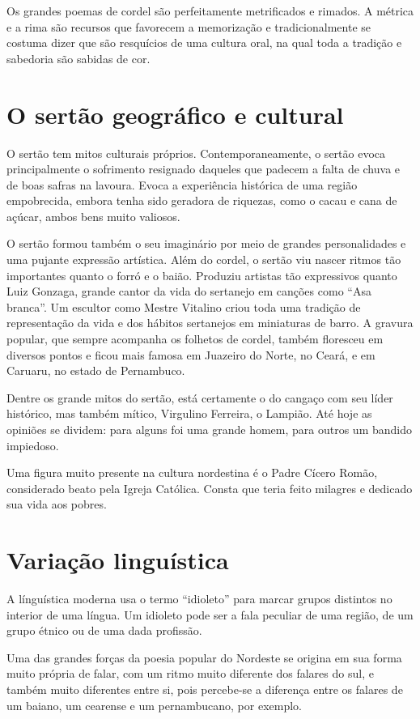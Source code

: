 Os grandes poemas de cordel são perfeitamente metrificados e rimados. A métrica
e a rima são recursos que favorecem a memorização e tradicionalmente se costuma
dizer que são resquícios de uma cultura oral, na qual toda a tradição e
sabedoria são sabidas de cor.  


\section{O sertão geográfico e cultural}

O sertão tem mitos culturais próprios. Contemporaneamente, o sertão evoca
principalmente o sofrimento resignado daqueles que padecem a falta de chuva e
de boas safras na lavoura. Evoca a experiência histórica de uma região
empobrecida, embora tenha sido geradora de riquezas, como o cacau e cana de
açúcar, ambos bens muito valiosos. 

O sertão formou também o seu imaginário por meio de grandes personalidades e
uma pujante expressão artística. Além do cordel, o sertão viu nascer ritmos tão
importantes quanto o forró e o baião. Produziu artistas tão expressivos quanto
Luiz Gonzaga, grande cantor da vida do sertanejo em canções como “Asa branca”.
Um escultor como Mestre Vitalino criou toda uma tradição de representação da
vida e dos hábitos sertanejos em miniaturas de barro. A gravura popular, que
sempre acompanha os folhetos de cordel, também floresceu em diversos pontos e
ficou mais famosa em Juazeiro do Norte, no Ceará, e em Caruaru, no estado de
Pernambuco. 

Dentre os grande mitos do sertão, está certamente o do cangaço com seu líder
histórico, mas também mítico, Virgulino Ferreira, o Lampião. Até hoje as
opiniões se dividem: para alguns foi uma grande homem, para outros um bandido
impiedoso. 

Uma figura muito presente na cultura nordestina é o Padre Cícero Romão,
considerado beato pela Igreja Católica. Consta que teria feito milagres e
dedicado sua vida aos pobres. 

\section{Variação linguística}

A línguística moderna usa o termo “idioleto” para marcar grupos distintos no
interior de uma língua. Um idioleto pode ser a fala peculiar de uma região, de
um grupo étnico ou de uma dada profissão. 

Uma das grandes forças da poesia popular do Nordeste se origina em sua forma
muito própria de falar, com um ritmo muito diferente dos falares do sul, e
também muito diferentes entre si, pois percebe-se a diferença entre os falares
de um baiano, um cearense e um pernambucano, por exemplo.

